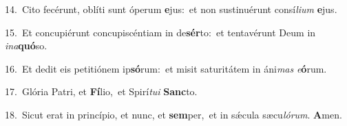{\numbfont\textcolor{\numbcolor}{14.}}~Cito fecérunt, oblíti sunt óperum \textbf{e}\-jus:~\star et non sustinuérunt consí\-\textit{li}\-\textit{um} \textbf{e}\-jus.\par
{\numbfont\textcolor{\numbcolor}{15.}}~Et concupiérunt concupiscéntiam in de\-\textbf{sér}\-to:~\star et tentavérunt Deum in \textit{in}\-\textit{a}\textbf{quó}so.\par
{\numbfont\textcolor{\numbcolor}{16.}}~Et dedit eis petitiónem ip\-\textbf{só}\-rum:~\star et misit saturitátem in áni\textit{mas} \textit{e}\-\textbf{ó}rum.\par
{\numbfont\textcolor{\numbcolor}{17.}}~Glória Patri, et \textbf{Fí}\-lio,~\star et Spirí\-\textit{tu}\-\textit{i} \textbf{Sanc}\-to.\par
{\numbfont\textcolor{\numbcolor}{18.}}~Sicut erat in princípio, et nunc, et \textbf{sem}\-per,~\star et in sǽcula sæcu\-\textit{ló}\-\textit{rum}. \textbf{A}\-men.\par

